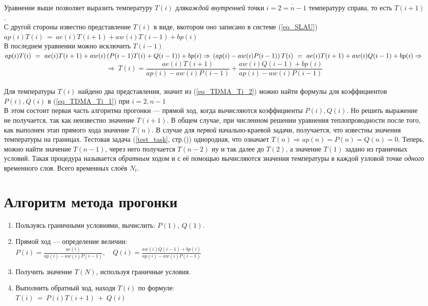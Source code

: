 \documentclass[oneside, final, 14pt]{report}
\begin{document}
Уравнение выше позволяет выразить температуру $T(i)$ для\emph{каждой внутренней} точки $i=\overline{2=n-1}$ температуру справа, то есть $T(i+1)$. \\
С другой стороны известно представление $T(i)$ в виде, вкотором оно записано в системе (\ref{eq_SLAU}) \\
$ap(i)T(i) \ = \ ae(i)T(i+1) + aw(i)T(i-1) + bp(i)$ \\
В последнем уравнении можно исключить $T(i-1)$ \\
\( ap(i)T(i) \ = \ ae(i)T(i+1) + aw(i)\left(P(i-1)T(i)+Q(i-1)\right) + bp(i) \Rightarrow \\
\left(ap(i) - aw(i)P(i-1)\right)T(i) \ = \ ae(i)T(i+1) + aw(i)Q(i-1) + bp(i) \Rightarrow \\ \)
\begin{equation}
\Rightarrow \ T(i) = \frac{ae(i)T(i+1)}{ap(i) - aw(i)P(i-1)} + \frac{aw(i)Q(i-1) + bp(i)}{ap(i) - aw(i)P(i-1)}
\label{eq_TDMA_Ti_2}
\end{equation}
\\
Для температуры $T(i)$ найдено два представления, значит из (\ref{eq_TDMA_Ti_2}) можно найти формулы для коэффициентов $P(i), Q(i)$ в (\ref{eq_TDMA_Ti_1}) при $i=\overline{2,n-1}$ \\
В этом состоит первая часть алгоритма прогонки --- прямой ход, когда вычисляются коэффициенты $P(i), Q(i)$. Но решить выражение не получается, так как неизвестно значение $T(i+1)$. В общем случае, при численном решении уравнения теплопроводности после того, как выполнен этап прямого хода значение $T(n)$. В случае для \emph{первой} начально-краевой задачи, получается, что известны значения температуры на границах. Тестовая задача (\ref{test_task}, стр.(\pageref{test_task_page})) однородная, что означает $T(n) \Rightarrow ap(n) = P(n) = Q(n) = 0$. Теперь, можно найти значение $T(n-1)$, через него получается $T(n-2)$ ну и так далее до $T(2)$, а значение $T(1)$ задано из граничных условий. Такая процедура называется \emph{обратным} ходом и с её помощью вычисляются значения температуры в каждой узловой точке \emph{одного} временного слоя. Всего временных слоёв $N_t$.

\section{Алгоритм метода прогонки}
\begin{enumerate}
 \item Пользуясь граничными условиями, вычислить: $P(1), \ Q(1)$.
 \item Прямой ход --- определение величин: \\ \(P(i) = \frac{ae(i)}{ap(i) - aw(i)P(i-1)}, \quad Q(i) = \frac{aw(i)Q(i-1) + bp(i)}{ap(i) - aw(i)P(i-1)}\)
 \item Получить значение $T(N)$, используя граничные условия. 
 \item Выполнить обратный ход, находя $T(i)$ по формуле: \\ $T(i) \ = \ P(i)T(i+1) \ + \ Q(i)$
\end{enumerate}
\end{document}
